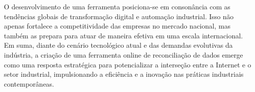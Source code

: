 O desenvolvimento de uma ferramenta posiciona-se em consonância com as tendências globais de transformação digital e automação industrial. Isso não apenas fortalece a competitividade das empresas no mercado nacional, mas também as prepara para atuar de maneira efetiva em uma escala internacional. Em suma, diante do cenário tecnológico atual e das demandas evolutivas da indústria, a criação de uma ferramenta online de reconciliação de dados emerge como uma resposta estratégica para potencializar a interseção entre a Internet e o setor industrial, impulsionando a eficiência e a inovação nas práticas industriais contemporâneas.